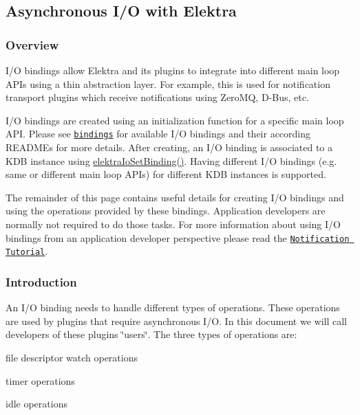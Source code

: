 \hypertarget{group__kdbio_async}{}\subsection{Asynchronous I/\+O with Elektra}\label{group__kdbio_async}
\hypertarget{group__kdbio_Overview}{}\subsubsection{Overview}\label{group__kdbio_Overview}
I/O bindings allow Elektra and its plugins to integrate into different main loop A\+P\+Is using a thin abstraction layer. For example, this is used for notification transport plugins which receive notifications using Zero\+MQ, D-\/\+Bus, etc.

I/O bindings are created using an initialization function for a specific main loop A\+PI. Please see \href{https://www.libelektra.org/bindings/readme}{\tt bindings} for available I/O bindings and their according R\+E\+A\+D\+M\+Es for more details. After creating, an I/O binding is associated to a K\+DB instance using \hyperlink{group__kdbio_ga187345483bdfbb404919c6797bc2db77}{elektra\+Io\+Set\+Binding()}. Having different I/O bindings (e.\+g. same or different main loop A\+P\+Is) for different K\+DB instances is supported.

The remainder of this page contains useful details for creating I/O bindings and using the operations provided by these bindings. Application developers are normally not required to do those tasks. For more information about using I/O bindings from an application developer perspective please read the \href{doc_tutorials_notifications_md.html}{\tt Notification Tutorial}.\hypertarget{group__kdbio_Introduction}{}\subsubsection{Introduction}\label{group__kdbio_Introduction}
An I/O binding needs to handle different types of operations. These operations are used by plugins that require asynchronous I/O. In this document we will call developers of these plugins \char`\"{}users\char`\"{}. The three types of operations are\+:
\begin{DoxyItemize}
\item file descriptor watch operations
\item timer operations
\item idle operations
\end{DoxyItemize}

